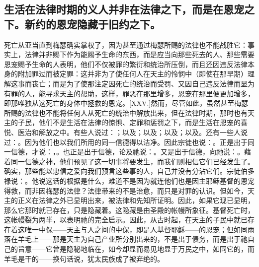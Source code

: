 
\subsection{生活在法律时期的义人并非在法律之下，而是在恩宠之下。新约的恩宠隐藏于旧约之下。}

死亡从亚当直到梅瑟确实掌权了，因为甚至通过梅瑟所赐的法律也不能战胜它：事实上，法律并非赐下作为能赐予生命的东西，而是应当向那些死去的人、那些需要恩宠赐予生命的人表明，他们不仅被罪的繁衍和统治所压倒，而且还因违反法律本身的附加罪过而被定罪：这并非为了使任何人在天主的怜悯中（即使在那早期）理解这事而丧亡；而是为了使那注定因死亡的统治而受罚、又因自己违反法律而显为有罪的人，能寻求天主的帮助，这样，罪恶在那里增多，恩宠在那里便更加增多，即那唯独从这死亡的身体中拯救的恩宠。[XXV.]然而，尽管如此，虽然甚至梅瑟所赐的法律也不能将任何人从死亡的统治中解放出来，但在法律时期，那时也有天主的子民，他们不是生活在法律的惊惧、定罪和惩罚之下，而是生活在恩宠的喜悦、医治和解放之中。有些人说过：；以及；以及；以及；以及。还有一些人说过：。因为他们也以我们所用的同一信德得以洁净。因此宗徒也说：。正是出于同一信德，才说：，。也正是出于信德，论及祂说：。又是出于信德，向祂说：。藉着同一信德之神，他们预见了这一切事将要发生，而我们则相信它们已经发生了。确实，那些能以忠信之爱向我们预言这些事的人，自己并没有分沾它们。宗徒伯多禄说：。他说这话的根据是什么，难道不是因为就连他们也是因主耶稣基督的恩宠得救，而非因梅瑟的法律？法律带来的不是治愈，而只是对罪的认识。但如今，天主的正义在法律之外已显明出来，被法律和先知所证明。因此，如果它现已显明，那么它那时就已存在，只是隐藏着。这隐藏是由圣殿的帐幔所象征。基督死亡时，这帐幔裂为两半，以表明祂的完全启示。因此，从古时起，在天主的子民中就已存在着这唯一中保——天主与人之间的中保，即是人基督耶稣——的恩宠；但如同雨落在羊毛上——那是天主为自己产业所分别出来的，不是出于债务，而是出于祂自己的旨意——它曾是隐秘地临在，如今却显而易见地显于万民之中，如同它的，而羊毛是干的——换句话说，犹太民族成了被弃绝的。\par

